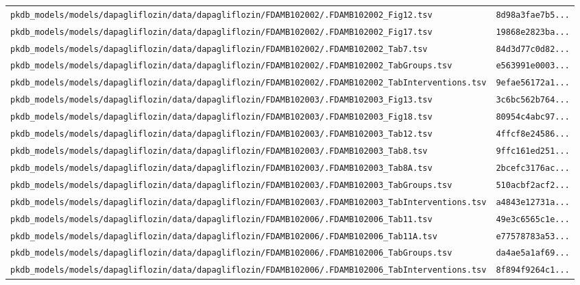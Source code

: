 \begin{longtable}{ll}
\texttt{pkdb\_models/models/dapagliflozin/data/dapagliflozin/FDAMB102002/.FDAMB102002\_Fig12.tsv} & \texttt{8d98a3fae7b5...} \\
\texttt{pkdb\_models/models/dapagliflozin/data/dapagliflozin/FDAMB102002/.FDAMB102002\_Fig17.tsv} & \texttt{19868e2823ba...} \\
\texttt{pkdb\_models/models/dapagliflozin/data/dapagliflozin/FDAMB102002/.FDAMB102002\_Tab7.tsv} & \texttt{84d3d77c0d82...} \\
\texttt{pkdb\_models/models/dapagliflozin/data/dapagliflozin/FDAMB102002/.FDAMB102002\_TabGroups.tsv} & \texttt{e563991e0003...} \\
\texttt{pkdb\_models/models/dapagliflozin/data/dapagliflozin/FDAMB102002/.FDAMB102002\_TabInterventions.tsv} & \texttt{9efae56172a1...} \\
\texttt{pkdb\_models/models/dapagliflozin/data/dapagliflozin/FDAMB102003/.FDAMB102003\_Fig13.tsv} & \texttt{3c6bc562b764...} \\
\texttt{pkdb\_models/models/dapagliflozin/data/dapagliflozin/FDAMB102003/.FDAMB102003\_Fig18.tsv} & \texttt{80954c4abc97...} \\
\texttt{pkdb\_models/models/dapagliflozin/data/dapagliflozin/FDAMB102003/.FDAMB102003\_Tab12.tsv} & \texttt{4ffcf8e24586...} \\
\texttt{pkdb\_models/models/dapagliflozin/data/dapagliflozin/FDAMB102003/.FDAMB102003\_Tab8.tsv} & \texttt{9ffc161ed251...} \\
\texttt{pkdb\_models/models/dapagliflozin/data/dapagliflozin/FDAMB102003/.FDAMB102003\_Tab8A.tsv} & \texttt{2bcefc3176ac...} \\
\texttt{pkdb\_models/models/dapagliflozin/data/dapagliflozin/FDAMB102003/.FDAMB102003\_TabGroups.tsv} & \texttt{510acbf2acf2...} \\
\texttt{pkdb\_models/models/dapagliflozin/data/dapagliflozin/FDAMB102003/.FDAMB102003\_TabInterventions.tsv} & \texttt{a4843e12731a...} \\
\texttt{pkdb\_models/models/dapagliflozin/data/dapagliflozin/FDAMB102006/.FDAMB102006\_Tab11.tsv} & \texttt{49e3c6565c1e...} \\
\texttt{pkdb\_models/models/dapagliflozin/data/dapagliflozin/FDAMB102006/.FDAMB102006\_Tab11A.tsv} & \texttt{e77578783a53...} \\
\texttt{pkdb\_models/models/dapagliflozin/data/dapagliflozin/FDAMB102006/.FDAMB102006\_TabGroups.tsv} & \texttt{da4ae5a1af69...} \\
\texttt{pkdb\_models/models/dapagliflozin/data/dapagliflozin/FDAMB102006/.FDAMB102006\_TabInterventions.tsv} & \texttt{8f894f9264c1...} \\

\end{longtable}
